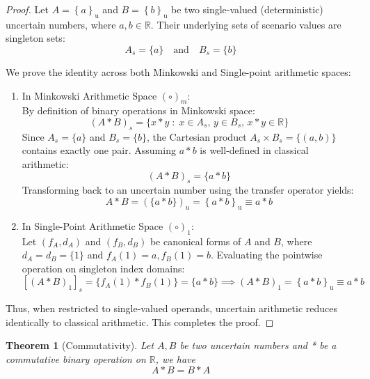 \documentclass[a4paper,12pt, twoside]{memoir}
\newtheorem{theorem}{Theorem}[chapter]
\newcommand{\set}[1]{\left\{#1\right\}} %
\newcommand{\s}[1]{\set{#1}_\mathrm{u}} %
\newcommand{\kgdd}[1]{\left(#1\right)_1} %
\begin{document}
\begin{proof}
	Let $A = \s{a}$ and $B = \s{b}$ be two single-valued (deterministic) uncertain numbers, where $a, b \in \mathbb{R}$. Their underlying sets of scenario values are singleton sets:
	\[
		A_s = \{a\} \quad \text{and} \quad B_s = \{b\}
	\]

	We prove the identity across both Minkowski and Single-point arithmetic spaces:

	\begin{enumerate}[leftmargin=*]
		\item In Minkowski Arithmetic Space $(\circ)_m$: \\
		      By definition of binary operations in Minkowski space:
		      \[
			      (A * B)_s = \{x * y \;:\; x \in A_s, \, y \in B_s, \, x * y \in \mathbb{R}\}
		      \]
		      Since $A_s = \{a\}$ and $B_s = \{b\}$, the Cartesian product $A_s \times B_s = \{(a, b)\}$ contains exactly one pair. Assuming $a * b$ is well-defined in classical arithmetic:
		      \[
			      (A * B)_s = \{a * b\}
		      \]
		      Transforming back to an uncertain number using the transfer operator yields:
		      \[
			      A * B = (\{a * b\})_u = \s{a * b} \equiv a * b
		      \]

		\item In Single-Point Arithmetic Space $(\circ)_1$: \\
		      Let $(f_A, d_A)$ and $(f_B, d_B)$ be canonical forms of $A$ and $B$, where $d_A = d_B = \{1\}$ and $f_A(1) = a, f_B(1) = b$.
		      Evaluating the pointwise operation on singleton index domains:
		      \[
			      [\kgdd{A * B}]_s = \{f_A(1) * f_B(1)\} = \{a * b\} \implies \kgdd{A * B} = \s{a * b} \equiv a * b
		      \]
	\end{enumerate}

	Thus, when restricted to single-valued operands, uncertain arithmetic reduces identically to classical arithmetic. This completes the proof.
\end{proof}
\begin{theorem}[Commutativity]
	Let $A,B$ be two uncertain numbers and * be a commutative binary operation on $\mathbb{R}$, we have
	$$A*B = B*A$$
\end{theorem}
\end{document}
